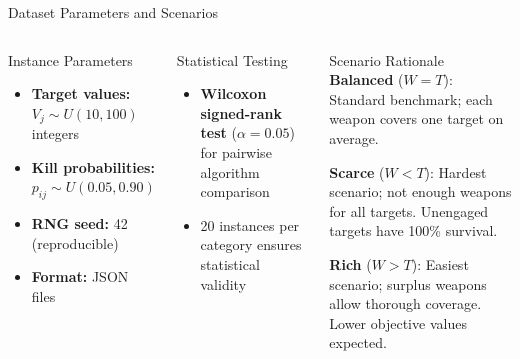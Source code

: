 \documentclass[aspectratio=43,8pt]{beamer}
\begin{document}
\begin{frame}{Dataset Parameters and Scenarios}
\begin{columns}[t]
\begin{block}{Instance Parameters}
\begin{itemize}
    \item \textbf{Target values:} $V_j \sim U(10, 100)$ integers
    \item \textbf{Kill probabilities:} $p_{ij} \sim U(0.05, 0.90)$
    \item \textbf{RNG seed:} 42 (reproducible)
    \item \textbf{Format:} JSON files
\end{itemize}
\end{block}

\begin{exampleblock}{Statistical Testing}
\begin{itemize}
    \item \textbf{Wilcoxon signed-rank test} ($\alpha = 0.05$) for pairwise algorithm comparison
    \item 20 instances per category ensures statistical validity
\end{itemize}
\end{exampleblock}

\begin{alertblock}{Scenario Rationale}
\textbf{Balanced} ($W = T$): Standard benchmark; each weapon covers one target on average.

\vspace{0.2cm}
\textbf{Scarce} ($W < T$): Hardest scenario; not enough weapons for all targets. Unengaged targets have 100\% survival.

\vspace{0.2cm}
\textbf{Rich} ($W > T$): Easiest scenario; surplus weapons allow thorough coverage. Lower objective values expected.
\end{alertblock}
\end{columns}
\end{frame}
\end{document}
